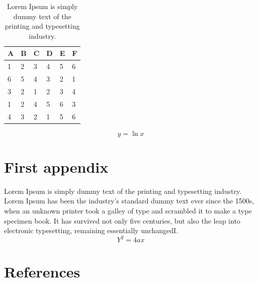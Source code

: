 \documentclass[3p,preprint,authoryear]{elsarticle}
\begin{document}
\begin{table}[tbp]
	\centering
	\caption{Lorem Ipsum is simply dummy text of the printing and typesetting industry.}
	\label{tab: table-1}
	\begin{tabular}{p{1cm}p{1cm}p{1cm}p{1cm}p{1cm}p{1cm}}
		\hline 
		A & B &  C &  D & E & F \\ 
		\hline 
		1 & 2 & 3 & 4 & 5 & 6 \\ 	
		6 & 5 & 4 & 3 & 2 & 1 \\ 
		3 & 2 & 1 & 2 & 3 & 4 \\ 
		1 & 2 & 4 & 5 & 6 & 3 \\ 
		4 & 3 & 2 & 1 & 5 & 6 \\ 
		\hline 
	\end{tabular} 	
\end{table}  

\begin{equation}
y = \ln x
\end{equation}  

\appendix
\section{First appendix}
Lorem Ipsum is simply dummy text of the printing and typesetting industry. Lorem Ipsum has been the industry's standard dummy text ever since the 1500s, when an unknown printer took a galley of type and scrambled it to make a type specimen book. It has survived not only five centuries, but also the leap into electronic typesetting, remaining essentially unchangedI\citep{Davies1998}.
\begin{equation}
Y^2 = 4ax
\end{equation}

\section*{References}


\end{document}
